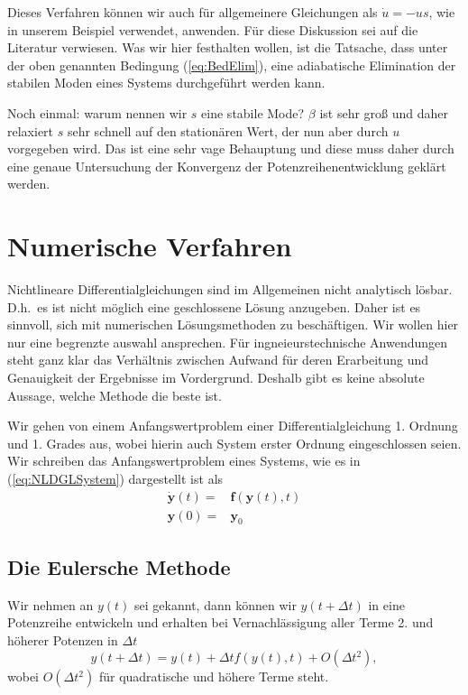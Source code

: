 Dieses Verfahren können wir auch für allgemeinere Gleichungen als $\dot u=-us$,
wie in unserem Beispiel verwendet, anwenden. Für diese Diskussion sei auf die
Literatur verwiesen. Was wir hier festhalten wollen, ist die Tatsache, dass
unter der oben genannten Bedingung (\ref{eq:BedElim}), eine adiabatische
Elimination der stabilen Moden eines Systems durchgeführt werden kann. 

Noch einmal: warum nennen wir $s$ eine stabile Mode? $\beta$ ist sehr groß und
daher relaxiert $s$ sehr schnell auf den stationären Wert, der nun aber durch
$u$ vorgegeben wird. Das ist eine sehr vage Behauptung und diese muss daher
durch eine genaue Untersuchung der Konvergenz der Potenzreihenentwicklung
geklärt werden.
\section{Numerische Verfahren}
Nichtlineare Differentialgleichungen sind im Allgemeinen nicht analytisch
lösbar. D.h.\ es ist nicht möglich eine geschlossene Lösung anzugeben. Daher
ist es sinnvoll, sich mit numerischen Lösungsmethoden zu beschäftigen.  Wir
wollen hier nur eine begrenzte auswahl ansprechen. Für ingneieurstechnische
Anwendungen steht ganz klar das Verhältnis zwischen Aufwand für deren
Erarbeitung und Genauigkeit der Ergebnisse im Vordergrund. Deshalb gibt es
keine absolute Aussage, welche Methode die beste ist.

Wir gehen von einem Anfangswertproblem einer Differentialgleichung 1. Ordnung
und 1. Grades aus, wobei hierin auch System erster Ordnung eingeschlossen
seien. Wir schreiben das Anfangswertproblem eines Systems, wie es in
(\ref{eq:NLDGLSystem}) dargestellt ist als
\begin{align}
  \dot{\mathbf{y}}(t) =& \mathbf{f}(\mathbf{y}(t),t) \label{eq:yNLSystem}\\
  \mathbf{y}(0)       =& \mathbf{y}_{0}\nonumber
\end{align}
\subsection{Die Eulersche Methode}
Wir nehmen an $y(t)$ sei gekannt, dann können wir $y(t+\Delta t)$ in eine
Potenzreihe entwickeln und erhalten bei Vernachlässigung aller Terme 2. und
höherer Potenzen in $\Delta t$ 
\begin{equation}
  y(t+\Delta t) = y(t)+\Delta t f(y(t),t)+O(\Delta t^2),
  \label{eq:Euler}
\end{equation}
wobei $O(\Delta t^2)$ für quadratische und höhere Terme steht.

